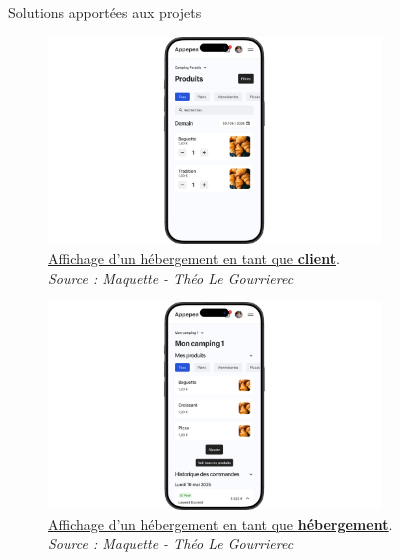 \documentclass{beamer}
\begin{document}
\begin{frame}{Solutions apportées aux projets}
\begin{center}
		 {
			\addtocounter{figure}{1}
			\begin{figure}[t]
  				\includegraphics[height=5.5cm]{../img/maquette/controlle_acces_client.png}
				\caption{	
					\centering			
  					\href{https://github.com/Matteo-K/Soutenance_E-delic/blob/main/img/maquette/controlle_acces_client.png}{\underline{Affichage d'un hébergement en tant que \textbf{client}}}.\\
  					\textit{Source : Maquette - Théo Le Gourrierec}
				}
  				\label{fig:controlle_acces_client}
  			\end{figure}
		}
		
		\only<4> {
			\addtocounter{figure}{2}
			\begin{figure}[t]
  				\includegraphics[height=5.5cm]{../img/maquette/controlle_acces_hebergement.png}
				\caption{	
					\centering			
  					\href{https://github.com/Matteo-K/Soutenance_E-delic/blob/main/img/maquette/controlle_acces_hebergement.png}{\underline{Affichage d'un hébergement en tant que \textbf{hébergement}}}.\\
  					\textit{Source : Maquette - Théo Le Gourrierec}
				}
  				\label{fig:controlle_acces_hebergement}
  			\end{figure}
		}
		

\end{center}
\end{frame}
\end{document}
